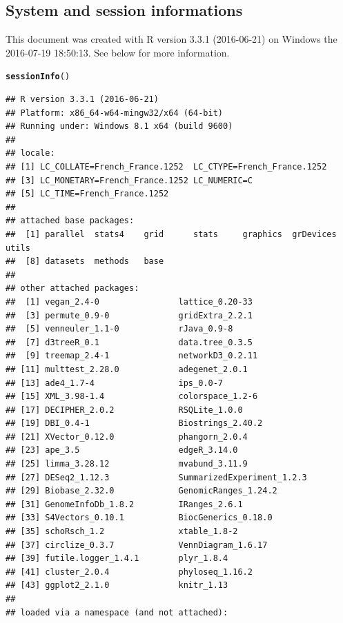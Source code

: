 \documentclass[12pt]{article}\usepackage[]{graphicx}\usepackage[]{color}
\makeatletter
\newcommand{\hlstd}[1]{\textcolor[rgb]{0.345,0.345,0.345}{#1}}%
\newcommand{\hlkwd}[1]{\textcolor[rgb]{0.737,0.353,0.396}{\textbf{#1}}}%
\newenvironment{kframe}{%
 \def\at@end@of@kframe{}%
 \ifinner\ifhmode%
  \def\at@end@of@kframe{\end{minipage}}%
  \begin{minipage}{\columnwidth}%
 \fi\fi%
 \def\FrameCommand##1{\hskip\@totalleftmargin \hskip-\fboxsep
 \colorbox{shadecolor}{##1}\hskip-\fboxsep
     \hskip-\linewidth \hskip-\@totalleftmargin \hskip\columnwidth}%
 \MakeFramed {\advance\hsize-\width
   \@totalleftmargin\z@ \linewidth\hsize
   \@setminipage}}%
 {\par\unskip\endMakeFramed%
 \at@end@of@kframe}
\newenvironment{knitrout}{}{} %
\numberwithin{figure}{section}
\makeatother
\begin{document}
  \subsection{System and session informations}
  This document was created with R version 3.3.1 (2016-06-21) on Windows the 2016-07-19 18:50:13. See below for more information. 
\begin{knitrout}\small
{}\color{fgcolor}\begin{kframe}
\begin{alltt}
\hlkwd{sessionInfo}\hlstd{()}
\end{alltt}
\begin{verbatim}
## R version 3.3.1 (2016-06-21)
## Platform: x86_64-w64-mingw32/x64 (64-bit)
## Running under: Windows 8.1 x64 (build 9600)
## 
## locale:
## [1] LC_COLLATE=French_France.1252  LC_CTYPE=French_France.1252   
## [3] LC_MONETARY=French_France.1252 LC_NUMERIC=C                  
## [5] LC_TIME=French_France.1252    
## 
## attached base packages:
##  [1] parallel  stats4    grid      stats     graphics  grDevices utils    
##  [8] datasets  methods   base     
## 
## other attached packages:
##  [1] vegan_2.4-0                lattice_0.20-33           
##  [3] permute_0.9-0              gridExtra_2.2.1           
##  [5] venneuler_1.1-0            rJava_0.9-8               
##  [7] d3treeR_0.1                data.tree_0.3.5           
##  [9] treemap_2.4-1              networkD3_0.2.11          
## [11] multtest_2.28.0            adegenet_2.0.1            
## [13] ade4_1.7-4                 ips_0.0-7                 
## [15] XML_3.98-1.4               colorspace_1.2-6          
## [17] DECIPHER_2.0.2             RSQLite_1.0.0             
## [19] DBI_0.4-1                  Biostrings_2.40.2         
## [21] XVector_0.12.0             phangorn_2.0.4            
## [23] ape_3.5                    edgeR_3.14.0              
## [25] limma_3.28.12              mvabund_3.11.9            
## [27] DESeq2_1.12.3              SummarizedExperiment_1.2.3
## [29] Biobase_2.32.0             GenomicRanges_1.24.2      
## [31] GenomeInfoDb_1.8.2         IRanges_2.6.1             
## [33] S4Vectors_0.10.1           BiocGenerics_0.18.0       
## [35] schoRsch_1.2               xtable_1.8-2              
## [37] circlize_0.3.7             VennDiagram_1.6.17        
## [39] futile.logger_1.4.1        plyr_1.8.4                
## [41] cluster_2.0.4              phyloseq_1.16.2           
## [43] ggplot2_2.1.0              knitr_1.13                
## 
## loaded via a namespace (and not attached):

\end{verbatim}
\end{kframe}
\end{knitrout}
\end{document}
